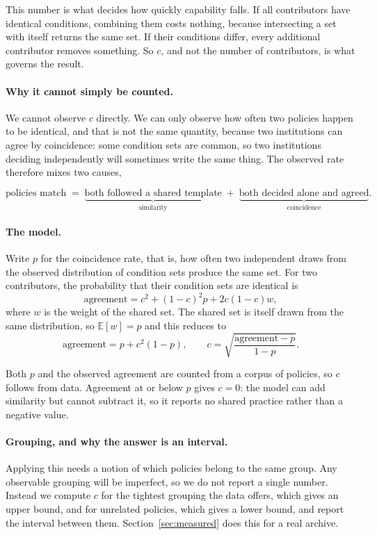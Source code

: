 \documentclass[sigconf,anonymous,review]{acmart}
\begin{document}
This number is what decides how quickly capability falls. If all contributors
have identical conditions, combining them costs nothing, because intersecting a
set with itself returns the same set. If their conditions differ, every
additional contributor removes something. So $c$, and not the number of
contributors, is what governs the result.

\paragraph{Why it cannot simply be counted.} We cannot observe $c$ directly. We
can only observe how often two policies happen to be identical, and that is not
the same quantity, because two institutions can agree by coincidence: some
condition sets are common, so two institutions deciding independently will
sometimes write the same thing. The observed rate therefore mixes two causes,

\[
\text{policies match} \;=\;
\underbrace{\text{both followed a shared template}}_{\text{similarity}}
\;+\;
\underbrace{\text{both decided alone and agreed}}_{\text{coincidence}} .
\]

\paragraph{The model.} Write $p$ for the coincidence rate, that is, how often two
independent draws from the observed distribution of condition sets produce the
same set. For two contributors, the probability that their condition sets are
identical is
\[
\mathrm{agreement} = c^2 + (1-c)^2 p + 2c(1-c)w,
\]
where $w$ is the weight of the shared set. The shared set is itself drawn from
the same distribution, so $\mathbb{E}[w]=p$ and this reduces to
\[
\mathrm{agreement} = p + c^2 (1-p),
\qquad
c = \sqrt{\frac{\mathrm{agreement}-p}{1-p}}.
\]

Both $p$ and the observed agreement are counted from a corpus of policies, so $c$
follows from data. Agreement at or below $p$ gives $c=0$: the model can add
similarity but cannot subtract it, so it reports no shared practice rather than a
negative value.

\paragraph{Grouping, and why the answer is an interval.} Applying this needs a
notion of which policies belong to the same group. Any observable grouping will
be imperfect, so we do not report a single number. Instead we compute $c$ for the
tightest grouping the data offers, which gives an upper bound, and for unrelated
policies, which gives a lower bound, and report the interval between them.
Section~\ref{sec:measured} does this for a real archive.
\end{document}

